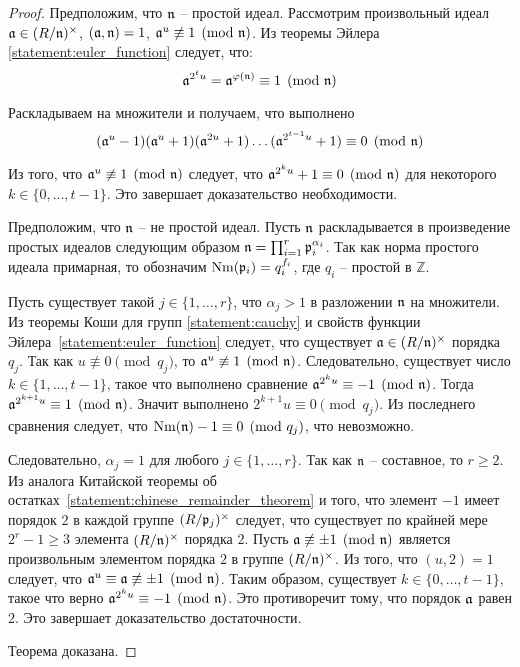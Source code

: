 \documentclass[_00_dissertation.tex]{subfiles}
\begin{document}
\begin{proof}
    Предположим, что $\mathfrak{n}$ -- простой идеал.
    Рассмотрим произвольный идеал $\mathfrak{a} \in (R/\mathfrak{n})^{\times}$, $(\mathfrak{a}, \mathfrak{n}) = 1$, $\mathfrak{a}^u \not\equiv 1 \pmod{\mathfrak{n}}$.
    Из теоремы Эйлера \ref{statement:euler_function} следует, что:
    \begin{equation*}
        \mathfrak{a}^{2^{t} u} = \mathfrak{a}^{\varphi(\mathfrak{n})} \equiv 1 \pmod{\mathfrak{n}}
    \end{equation*}

    Раскладываем на множители и получаем, что выполнено
    \begin{equation*}
        (\mathfrak{a}^{u} - 1)(\mathfrak{a}^{u} + 1)(\mathfrak{a}^{2u} + 1)\dots(\mathfrak{a}^{2^{t-1}u} + 1) \equiv 0 \pmod{\mathfrak{n}}
    \end{equation*}

    Из того, что $\mathfrak{a}^{u} \not\equiv 1 \pmod{\mathfrak{n}}$ следует, что $\mathfrak{a}^{2^{k}u} + 1 \equiv 0 \pmod{\mathfrak{n}}$ для некоторого $k\in \{0, \dots, t-1\}$.
    Это завершает доказательство необходимости.

    Предположим, что $\mathfrak{n}$ -- не простой идеал.
    Пусть $\mathfrak{n}$ раскладывается в произведение простых идеалов следующим образом $\mathfrak{n} = \prod_{i=1}^{r} \mathfrak{p}_i^{\alpha_i}$.
    Так как норма простого идеала примарная, то обозначим $\textrm{Nm}(\mathfrak{p}_i) = q_i^{f_i}$, где $q_i$ -- простой в $\mathbb{Z}$.

    Пусть существует такой $j \in \{1, \dots, r\}$, что $\alpha_j > 1$ в разложении $\mathfrak{n}$ на множители.
    Из теоремы Коши для групп \ref{statement:cauchy} и свойств функции Эйлера~\ref{statement:euler_function} следует, что существует $\mathfrak{a} \in (R/\mathfrak{n})^{\times}$ порядка $q_j$.
    Так как $u \not\equiv 0 \pmod{q_j}$, то $\mathfrak{a}^u \not\equiv 1 \pmod{\mathfrak{n}}$.
    Следовательно, существует число $k \in \{1, \dots, t-1\}$, такое что выполнено сравнение $\mathfrak{a}^{2^{k}u} \equiv -1 \pmod{\mathfrak{n}}$.
    Тогда $\mathfrak{a}^{2^{k+1}u} \equiv 1 \pmod{\mathfrak{n}}$.
    Значит выполнено $2^{k+1}u \equiv 0 \pmod{q_j}$.
    Из последнего сравнения следует, что $\textrm{Nm}(\mathfrak{n}) - 1 \equiv 0 \pmod{q_j}$, что невозможно.
    
    Следовательно, $\alpha_j = 1$ для любого $j \in \{1, \ldots, r\}$.
    Так как $\mathfrak{n}$ -- составное, то $r \ge 2$.
    Из аналога Китайской теоремы об остатках~\ref{statement:chinese_remainder_theorem} и того, что элемент $-1$ имеет порядок $2$ в каждой группе $(R/\mathfrak{p}_j)^{\times}$ следует, что существует по крайней мере $2^r-1 \ge 3$ элемента $(R/\mathfrak{n})^{\times}$ порядка $2$.
    Пусть $\mathfrak{a} \not\equiv \pm 1 \pmod{\mathfrak{n}}$ является произвольным элементом порядка $2$ в группе $(R/\mathfrak{n})^{\times}$.
    Из того, что $(u, 2) = 1$ следует, что $\mathfrak{a}^u \equiv \mathfrak{a} \not\equiv \pm 1 \pmod{\mathfrak{n}}$.
    Таким образом, существует $k \in \{0,\ldots, t-1\}$, такое что верно $\mathfrak{a}^{2^{k}u} \equiv -1 \pmod{\mathfrak{n}}$.
    Это противоречит тому, что порядок $\mathfrak{a}$ равен $2$.
    Это завершает доказательство достаточности.

    Теорема доказана.
\end{proof}
\end{document}
